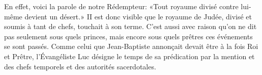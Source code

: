 En effet, voici la parole de notre Rédempteur:
	«Tout royaume divisé contre lui-même devient un désert.»
II est donc visible que le royaume de Judée, divisé et soumis à tant de chefs,
	touchait à son terme.
C’est aussi avec raison qu’on ne dit pas seulement sous quels princes,
	mais encore sous quels prêtres ces événements se sont passés.
Comme celui que Jean-Baptiste annonçait devait être à la fois Roi et Prêtre,
	l’Évangéliste Luc désigne le temps de sa prédication
	par la mention et des chefs temporels et des autorités sacerdotales.
